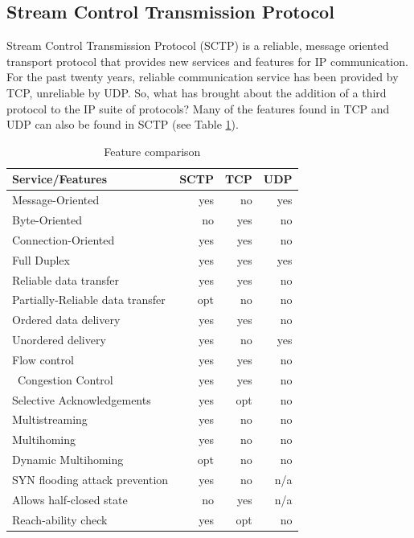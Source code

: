 \documentclass[a4paper]{article}
\begin{document}
\subsection{Stream Control Transmission Protocol}
Stream Control Transmission Protocol (SCTP) is a reliable, message oriented transport protocol that provides new services and features for IP communication. For the past twenty years, reliable communication service has been provided by TCP, unreliable by UDP. So, what has brought about the addition of a third protocol to the IP suite of protocols? Many of the features found in TCP and UDP can also be found in SCTP (see Table \ref{tab_sctp_features}).
\begin{table}[H]
	\centering
	\begin{tabular}{ l  r  r  r  }
		
		\textbf{Service/Features} & \textbf{SCTP} & \textbf{TCP} & \textbf{UDP} \\ \hline \hline
		Message-Oriented & yes & no & yes \\
		Byte-Oriented & no & yes & no \\ 
		Connection-Oriented & yes & yes & no \\ 
		Full Duplex & yes & yes & yes \\ 
		Reliable data transfer & yes & yes & no \\ 
		Partially-Reliable data transfer & opt & no & no \\ 
		Ordered data delivery & yes & yes & no \\ 
		Unordered delivery & yes & no & yes \\ 
		Flow control & yes & yes & no \\ \
		Congestion Control & yes & yes & no \\ 
		Selective Acknowledgements & yes & opt & no \\ 
		Multistreaming & yes & no & no \\ 
		Multihoming & yes & no & no \\ 
		Dynamic Multihoming & opt & no & no \\ 
		SYN flooding attack prevention & yes & no & n/a \\ 
		Allows half-closed state & no & yes & n/a \\ 
		Reach-ability check & yes & opt & no \\ 
	\end{tabular}
	\caption{Feature comparison}
	\label{tab_sctp_features}
\end{table}
\end{document}
